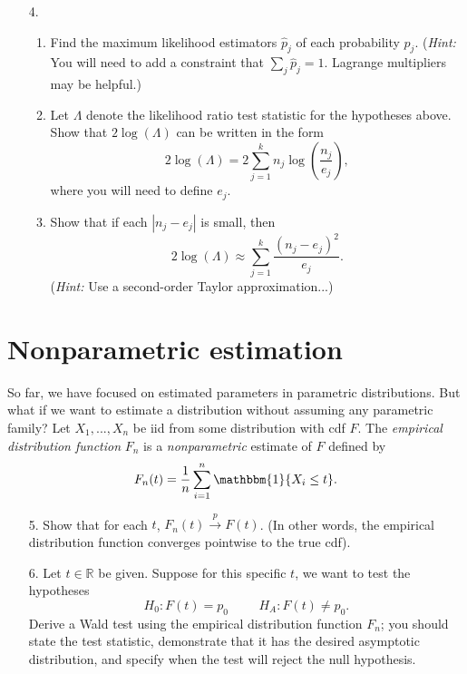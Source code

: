 \documentclass[11pt]{article}
\begin{document}
\begin{enumerate}
\item[4.]

\begin{enumerate}
\item Find the maximum likelihood estimators $\widehat{p}_j$ of each probability $p_j$. (\textit{Hint:} You will need to add a constraint that $\sum_j \widehat{p}_j = 1$. Lagrange multipliers may be helpful.)

\item Let $\Lambda$ denote the likelihood ratio test statistic for the hypotheses above. Show that $2 \log(\Lambda)$ can be written in the form
$$2 \log(\Lambda) = 2 \sum \limits_{j=1}^k n_j \log \left( \frac{n_j}{e_j} \right),$$
where you will need to define $e_j$.

\item Show that if each $|n_j - e_j|$ is small, then 
$$2 \log(\Lambda) \approx \sum \limits_{j=1}^k \frac{(n_j - e_j)^2}{e_j}.$$
(\textit{Hint:} Use a second-order Taylor approximation...)
\end{enumerate}
\end{enumerate}

\section*{Nonparametric estimation}

So far, we have focused on estimated parameters in parametric distributions. But what if we want to estimate a distribution without assuming any parametric family? Let $X_1,...,X_n$ be iid from some distribution with cdf $F$. The \textit{empirical distribution function} $F_n$ is a \textit{nonparametric} estimate of $F$ defined by
$$F_n(t) = \frac{1}{n} \sum \limits_{i=1}^n \mathbbm{1}\{X_i \leq t \}.$$

\begin{enumerate}

\item[5.] Show that for each $t$, $F_n(t) \overset{p}{\to} F(t)$. (In other words, the empirical distribution function converges pointwise to the true cdf).

\item[6.] Let $t \in \mathbb{R}$ be given. Suppose for this specific $t$, we want to test the hypotheses 
$$H_0: F(t) = p_0 \hspace{1cm} H_A: F(t) \neq p_0.$$
Derive a Wald test using the empirical distribution function $F_n$; you should state the test statistic, demonstrate that it has the desired asymptotic distribution, and specify when the test will reject the null hypothesis.

\end{enumerate}
\end{document}
